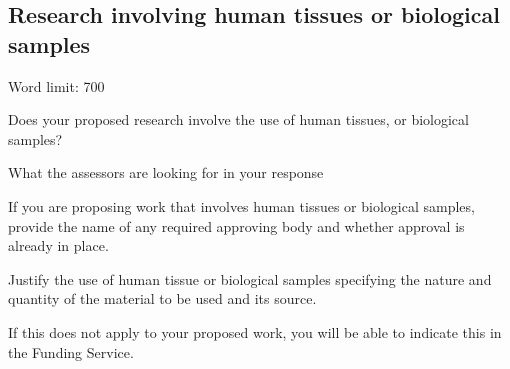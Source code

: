\documentclass[12pt]{article}
\newenvironment{instruction}{\par\color{red}}{\par}
\begin{document}
\pagebreak
\subsection{Research involving human tissues or biological samples}

\begin{instruction}

Word limit: 700

Does your proposed research involve the use of human tissues, or biological
samples?

What the assessors are looking for in your response

If you are proposing work that involves human tissues or biological samples,
provide the name of any required approving body and whether approval is
already in place.

Justify the use of human tissue or biological samples specifying the nature and
quantity of the material to be used and its source.

If this does not apply to your proposed work, you will be able to indicate this in
the Funding Service.

\end{instruction}
\end{document}
